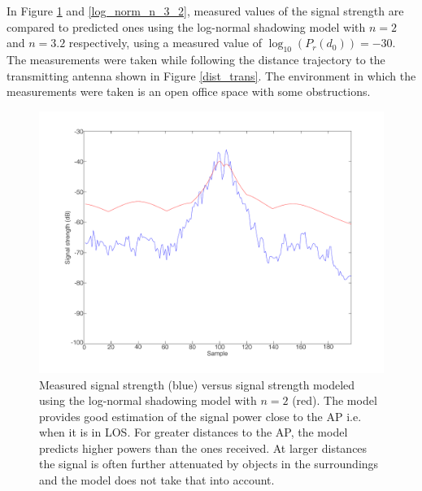 \documentclass{LTHthesis}
\begin{document}
In Figure \ref{log_norm_n_2} and \ref{log_norm_n_3_2}, measured values of the signal strength are compared to predicted ones using the log-normal shadowing model with $n=2$ and $n=3.2$ respectively, using a measured value of $\log_{10}({P_r(d_0)})= -30$. The measurements were taken while following the distance trajectory to the transmitting antenna shown in Figure \ref{dist_trans}. The environment in which the measurements were taken is an open office space with some obstructions.
%
\begin{figure}[!hbt]

\includegraphics[width=1\textwidth]{images/signal_model/log_norm_n_2}
\caption{Measured signal strength (blue) versus signal strength modeled using the log-normal shadowing model with $n=2$ (red). The model provides good estimation of the signal power close to the AP i.e. when it is in LOS. For greater distances to the AP, the model predicts higher powers than the ones received. At larger distances the signal is often further attenuated by objects in the surroundings and the model does not take that into account.}\label{log_norm_n_2}
\end{figure}
%
\end{document}
